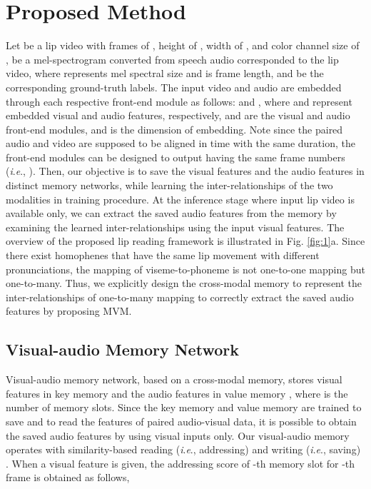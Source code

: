 \documentclass[letterpaper]{article} \usepackage{aaai22}  \usepackage{times}  \usepackage{helvet}  \usepackage{courier}  \usepackage[hyphens]{url}  \usepackage{graphicx} \urlstyle{rm} \def\UrlFont{\rm}  \usepackage{natbib}  \usepackage{caption} \DeclareCaptionStyle{ruled}{labelfont=normalfont,labelsep=colon,strut=off} \frenchspacing  \setlength{\pdfpagewidth}{8.5in}  \setlength{\pdfpageheight}{11in}  \usepackage{algorithm}
\newcommand{\ie}{\textit{i}.\textit{e}.}
\begin{document}
\section{Proposed Method}
Let  be a lip video with frames of , height of , width of , and color channel size of ,  be a mel-spectrogram converted from speech audio corresponded to the lip video, where  represents mel spectral size and  is frame length, and  be the corresponding ground-truth labels. The input video  and audio  are embedded through each respective front-end module as follows:  and , where  and  represent embedded visual and audio features, respectively,  and  are the visual and audio front-end modules, and  is the dimension of embedding. Note since the paired audio and video are supposed to be aligned in time with the same duration, the front-end modules can be designed to output having the same frame numbers (\ie, ). Then, our objective is to save the visual features  and the audio features  in distinct memory networks, while learning the inter-relationships of the two modalities in training procedure. At the inference stage where input lip video is available only, we can extract the saved audio features from the memory by examining the learned inter-relationships using the input visual features. 
The overview of the proposed lip reading framework is illustrated in Fig. \ref{fig:1}a. Since there exist homophenes that have the same lip movement with different pronunciations, the mapping of viseme-to-phoneme is not one-to-one mapping but one-to-many. Thus, we explicitly design the cross-modal memory to represent the inter-relationships of one-to-many mapping to correctly extract the saved audio features by proposing MVM.

\subsection{Visual-audio Memory Network}
Visual-audio memory network, based on a cross-modal memory, stores visual features in key memory  and the audio features in value memory , where  is the number of memory slots. Since the key memory and value memory are trained to save and to read the features of paired audio-visual data, it is possible to obtain the saved audio features by using visual inputs only. Our visual-audio memory operates with similarity-based reading (\ie, addressing) and writing (\ie, saving) \cite{kim2021visualaudiomem, lee2021videopredictionmem}. When a visual feature  is given, the addressing score of -th memory slot for -th frame is obtained as follows,
\end{document}
